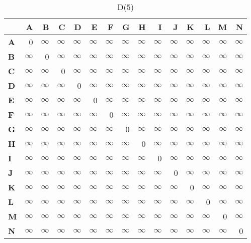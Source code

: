 \documentclass{article}
\newcommand{\INF}{$\infty$}
\begin{document}
\begin{table}[H]\centering
\caption{D(5)}
\begin{tabular}{l r r r r r r r r r r r r r r}
\toprule
 & \textbf{A} & \textbf{B} & \textbf{C} & \textbf{D} & \textbf{E} & \textbf{F} & \textbf{G} & \textbf{H} & \textbf{I} & \textbf{J} & \textbf{K} & \textbf{L} & \textbf{M} & \textbf{N}\\\midrule
\textbf{A} & 0 & \INF & \INF & \INF & \INF & \INF & \INF & \INF & \INF & \INF & \INF & \INF & \INF & \INF \\
\textbf{B} & \INF & 0 & \INF & \INF & \INF & \INF & \INF & \INF & \INF & \INF & \INF & \INF & \INF & \INF \\
\textbf{C} & \INF & \INF & 0 & \INF & \INF & \INF & \INF & \INF & \INF & \INF & \INF & \INF & \INF & \INF \\
\textbf{D} & \INF & \INF & \INF & 0 & \INF & \INF & \INF & \INF & \INF & \INF & \INF & \INF & \INF & \INF \\
\textbf{E} & \INF & \INF & \INF & \INF & 0 & \INF & \INF & \INF & \INF & \INF & \INF & \INF & \INF & \INF \\
\textbf{F} & \INF & \INF & \INF & \INF & \INF & 0 & \INF & \INF & \INF & \INF & \INF & \INF & \INF & \INF \\
\textbf{G} & \INF & \INF & \INF & \INF & \INF & \INF & 0 & \INF & \INF & \INF & \INF & \INF & \INF & \INF \\
\textbf{H} & \INF & \INF & \INF & \INF & \INF & \INF & \INF & 0 & \INF & \INF & \INF & \INF & \INF & \INF \\
\textbf{I} & \INF & \INF & \INF & \INF & \INF & \INF & \INF & \INF & 0 & \INF & \INF & \INF & \INF & \INF \\
\textbf{J} & \INF & \INF & \INF & \INF & \INF & \INF & \INF & \INF & \INF & 0 & \INF & \INF & \INF & \INF \\
\textbf{K} & \INF & \INF & \INF & \INF & \INF & \INF & \INF & \INF & \INF & \INF & 0 & \INF & \INF & \INF \\
\textbf{L} & \INF & \INF & \INF & \INF & \INF & \INF & \INF & \INF & \INF & \INF & \INF & 0 & \INF & \INF \\
\textbf{M} & \INF & \INF & \INF & \INF & \INF & \INF & \INF & \INF & \INF & \INF & \INF & \INF & 0 & \INF \\
\textbf{N} & \INF & \INF & \INF & \INF & \INF & \INF & \INF & \INF & \INF & \INF & \INF & \INF & \INF & 0 \\
\bottomrule
\end{tabular}
\end{table}
\end{document}
